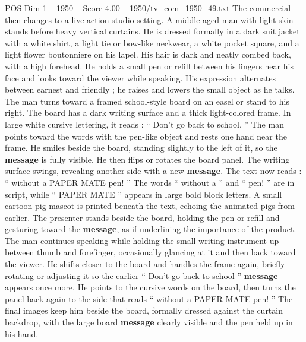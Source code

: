 \begin{textsample}{POS Dim 1 – 1950 – Score 4.00 – 1950/tv\_com\_1950\_49.txt}
The commercial then changes to a live-action studio setting.
A middle-aged man with light skin stands before heavy vertical curtains.
He is dressed formally in a dark suit jacket with a white shirt, a light tie or bow-like neckwear, a white pocket square, and a light flower boutonniere on his lapel.
His hair is dark and neatly combed back, with a high forehead.
He holds a small pen or refill between his fingers near his face and looks toward the viewer while speaking.
His expression alternates between earnest and friendly ; he raises and lowers the small object as he talks.
The man turns toward a framed school-style board on an easel or stand to his right.
The board has a dark writing surface and a thick light-colored frame.
In large white cursive lettering, it reads : “ Don't go back to school. ” The man points toward the words with the pen-like object and rests one hand near the frame.
He smiles beside the board, standing slightly to the left of it, so the \textbf{message} is fully visible.
He then flips or rotates the board panel.
The writing surface swings, revealing another side with a new \textbf{message}.
The text now reads : “ without a PAPER MATE pen! ” The words “ without a ” and “ pen! ” are in script, while “ PAPER MATE ” appears in large bold block letters.
A small cartoon pig mascot is printed beneath the text, echoing the animated pigs from earlier.
The presenter stands beside the board, holding the pen or refill and gesturing toward the \textbf{message}, as if underlining the importance of the product.
The man continues speaking while holding the small writing instrument up between thumb and forefinger, occasionally glancing at it and then back toward the viewer.
He shifts closer to the board and handles the frame again, briefly rotating or adjusting it so the earlier “ Don't go back to school ” \textbf{message} appears once more.
He points to the cursive words on the board, then turns the panel back again to the side that reads “ without a PAPER MATE pen! ” The final images keep him beside the board, formally dressed against the curtain backdrop, with the large board \textbf{message} clearly visible and the pen held up in his hand.

\end{textsample}
